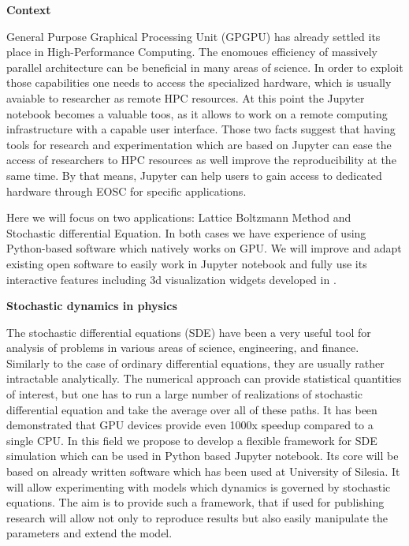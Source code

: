 \begin{task}[
  title=Application: Reproducible research based on GPU,
  id=application-gpu,
  lead=SIL,
  PM=12,
  wphases={4-36},
  partners={}
]


\textbf{Context}

 General Purpose Graphical Processing Unit (GPGPU) has already settled its place in High-Performance Computing. The enomoues efficiency of massively parallel architecture can be beneficial in many areas of science. In order to exploit those capabilities one needs to access the specialized hardware, which is usually avaiable to researcher as remote HPC resources. At this point the Jupyter notebook becomes a valuable toos, as it allows to work on a remote computing infrastructure with a capable user interface. Those two facts suggest that having tools for research and experimentation which are based on Jupyter can ease the access of researchers to HPC resources as well improve the reproducibility at the same time. By that means, Jupyter can help users to gain access to dedicated hardware through EOSC for specific applications.

Here we will focus on two applications: Lattice Boltzmann Method and Stochastic differential Equation. In both cases we have experience of using Python-based software which natively works on GPU. We will improve and adapt existing open software to easily work in Jupyter notebook and fully use its interactive features including 3d visualization widgets developed in .


\textbf{Stochastic dynamics in physics}

The stochastic differential equations (SDE) have been a very useful tool for analysis of problems in various areas of science, engineering, and finance. Similarly to the case of ordinary differential equations, they are usually rather intractable analytically. The numerical approach can provide  statistical quantities of interest, but one has to run a large number of realizations of stochastic differential equation and take the average over all of these paths. It has been demonstrated that GPU devices provide even 1000x speedup compared to a single CPU\cite{januszewski2010accelerating,spiechowicz2015gpu}. In this field we propose to develop a flexible framework for SDE simulation which can be used in Python based Jupyter notebook. Its core will be based on already written software which has been used at University of Silesia.  It will allow experimenting with models which dynamics is governed by stochastic equations. The aim is to provide such a framework, that if used for publishing research will allow not only to reproduce results but also easily manipulate the parameters and extend the model.


\end{task}
